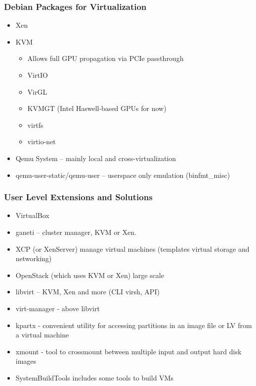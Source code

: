 \documentclass{beamer}
\begin{document}
\begin{frame}
\frametitle{Debian Packages for Virtualization}

\begin{itemize}
 \item Xen
 \item KVM
 \begin{itemize}
  \item Allows full GPU propagation via PCIe passthrough
  \item VirtIO
  \item VirGL
  \item KVMGT (Intel Haswell-based GPUs for now)
  \item virtfs
  \item virtio-net
 \end{itemize}
 \item Qemu System -- mainly local and cross-virtualization
 \item qemu-user-static/qemu-user -- userspace only emulation (binfmt\_misc)
\end{itemize}
\end{frame}

\begin{frame}
\frametitle{User Level Extensions and Solutions}

\begin{itemize}
 \item VirtualBox
 \item ganeti -- cluster manager, KVM or Xen.
 \item XCP (or XenServer) manage virtual machines (templates virtual storage and networking) 
 \item OpenStack (which uses KVM or Xen) large scale 
 \item libvirt -- KVM, Xen and more (CLI virsh, API) 
 \item virt-manager - above libvirt 
 \item kpartx - convenient utility for accessing partitions in an image file or LV from a virtual machine 
 \item xmount - tool to crossmount between multiple input and output hard disk images 
 \item SystemBuildTools includes some tools to build VMs
\end{itemize}
\end{frame}
\end{document}
